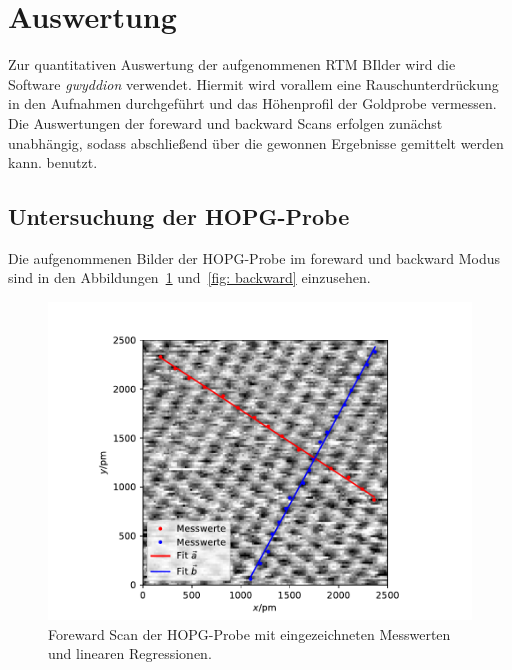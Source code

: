 \section{Auswertung}
Zur quantitativen Auswertung der aufgenommenen RTM BIlder wird die Software \emph{gwyddion}\cite{gwyddion}
verwendet. Hiermit wird vorallem eine Rauschunterdrückung in den Aufnahmen durchgeführt und das Höhenprofil
der Goldprobe vermessen. Die Auswertungen der foreward und backward Scans erfolgen zunächst unabhängig, sodass
abschließend über die gewonnen Ergebnisse gemittelt werden kann.
\cite{uncertainties} benutzt.

\subsection{Untersuchung der HOPG-Probe}
Die aufgenommenen Bilder der HOPG-Probe im foreward und backward Modus sind in den Abbildungen~\ref{fig: foreward}
und~\ref{fig: backward} einzusehen.
\begin{figure}
  \centering
  \includegraphics[width = \textwidth]{../Messdaten/bilder/fit_01_foreward.pdf}
  \caption{Foreward Scan der HOPG-Probe mit eingezeichneten Messwerten und linearen Regressionen.}
  \label{fig: foreward}
\end{figure}
